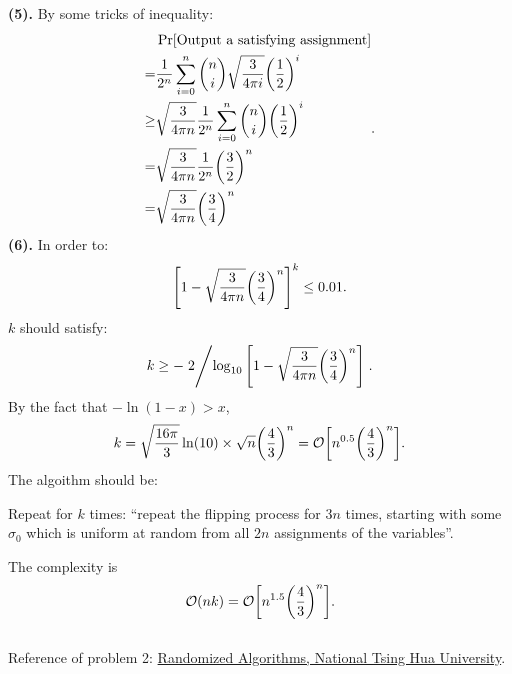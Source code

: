 \documentclass{article}
\begin{document}
\newpage
\textbf{(5).} By some tricks of inequality:
\[
	\begin{aligned}
		&\Pr[\text{Output a satisfying assignment}]
		\\=&
		\frac{1}{2^n}\sum_{i=0}^n \binom{n}{i}\sqrt{\frac{3}{4\pi i}}\qty(\frac{1}{2})^i
		\\\ge &
		\sqrt{\frac{3}{4\pi n}}\frac{1}{2^n}\sum_{i=0}^n \binom{n}{i}\qty(\frac{1}{2})^i
		\\=&
		\sqrt{\frac{3}{4\pi n}}\frac{1}{2^n}\qty(\frac{3}{2})^n		
		\\=&
		\sqrt{\frac{3}{4\pi n}}\qty(\frac{3}{4})^n		
	\end{aligned}
.\] 
\textbf{(6).}
In order to:
\[
	\qty[1-\sqrt{\frac{3}{4\pi n}}\qty(\frac{3}{4})^n]^k
	\le 0.01
.\] 
$k$ should satisfy:
\[
	k\ge -\flatfrac{2}{\log_{10}\qty[1-\sqrt{\frac{3}{4\pi n}}\qty(\frac{3}{4})^n]}
.\] By the fact that $-\ln(1-x)>x$,
\[
	k=\sqrt{\frac{16\pi}{3}}\ln(10)\times
	\sqrt{n}\qty(\frac{4}{3})^n
	=
	\mathcal{O}\qty[n^{0.5}\qty(\frac{4}{3})^n]
.\] 
The algoithm should be:

Repeat for $k$ times: ``repeat the flipping process for $3n$ times, starting with some $\sigma_0$ which is uniform at random from all $2n$ assignments of the variables''.

The complexity is \[\mathcal{O}(nk)=\mathcal{O}\qty[n^{1.5}\qty(\frac{4}{3})^n].\]
\\[5pt]
Reference of problem 2: \href{http://www.cs.nthu.edu.tw/~wkhon/random12/lecture/lecture22.pdf}{Randomized Algorithms, National Tsing Hua University}.
\end{document}
